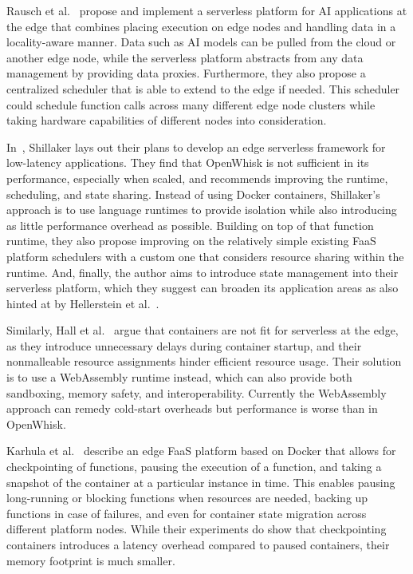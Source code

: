 Rausch et al.~\cite{Rausch2019-eo} propose and implement a serverless platform for AI applications at the edge that combines placing execution on edge nodes and handling data in a locality-aware manner.
Data such as AI models can be pulled from the cloud or another edge node, while the serverless platform abstracts from any data management by providing data proxies.
Furthermore, they also propose a centralized scheduler that is able to extend to the edge if needed.
This scheduler could schedule function calls across many different edge node clusters while taking hardware capabilities of different nodes into consideration.

In~\cite{Shillaker2018-di}, Shillaker lays out their plans to develop an edge serverless framework for low-latency applications.
They find that OpenWhisk is not sufficient in its performance, especially when scaled, and recommends improving the runtime, scheduling, and state sharing.
Instead of using Docker containers, Shillaker's approach is to use language runtimes to provide isolation while also introducing as little performance overhead as possible.
Building on top of that function runtime, they also propose improving on the relatively simple existing FaaS platform schedulers with a custom one that considers resource sharing within the runtime.
And, finally, the author aims to introduce state management into their serverless platform, which they suggest can broaden its application areas as also hinted at by Hellerstein et al.~\cite{paper_hellerstein_serverless}.

Similarly, Hall et al.~\cite{Hall2019-im} argue that containers are not fit for serverless at the edge, as they introduce unnecessary delays during container startup, and their nonmalleable resource assignments hinder efficient resource usage.
Their solution is to use a WebAssembly runtime instead, which can also provide both sandboxing, memory safety, and interoperability.
Currently the WebAssembly approach can remedy cold-start overheads but performance is worse than in OpenWhisk.

Karhula et al.~\cite{Karhula2019-en} describe an edge FaaS platform based on Docker that allows for checkpointing of functions, pausing the execution of a function, and taking a snapshot of the container at a particular instance in time.
This enables pausing long-running or blocking functions when resources are needed, backing up functions in case of failures, and even for container state migration across different platform nodes.
While their experiments do show that checkpointing containers introduces a latency overhead compared to paused containers, their memory footprint is much smaller.
